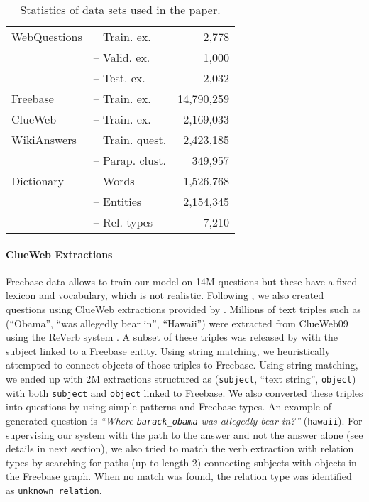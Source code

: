 \documentclass[runningheads,a4paper]{llncs}
\newcommand{\fb}{{\sc Freebase}\xspace}
\newcommand{\wk}{{\sc WikiAnswers}\xspace}
\newcommand{\wq}{{\sc WebQuestions}\xspace}
\newcommand{\cw}{{\sc ClueWeb}\xspace}
\newcommand{\ent}[1]{{\small {\tt #1}}}
\begin{document}
\begin{table}[t!]
\begin{center}
\begin{small}
\begin{tabular}{|ll|r|}
\hline 
\wq & -- Train. ex. & 2,778\\
& -- Valid. ex. & 1,000\\
& -- Test. ex. & 2,032\\
\fb & -- Train. ex. & 14,790,259 \\
\cw & -- Train. ex. & 2,169,033 \\
\wk & -- Train. quest. & 2,423,185 \\
 & -- Parap. clust. & 349,957 \\
\hline 
Dictionary & -- Words & 1,526,768\\
& -- Entities &  2,154,345 \\
& -- Rel. types & 7,210 \\ 
\hline 
\end{tabular}
\end{small}
\caption{\label{tab:stats} Statistics of data sets used in the paper.}
\end{center}
\end{table}



\paragraph{ClueWeb Extractions}

\fb data allows to train our model on 14M questions but these have a
fixed lexicon and vocabulary, which is not realistic.
Following  \cite{berant-EtAl:2013:EMNLP}, we also created questions
using \cw extractions provided by \cite{lin2012entity}.
Millions of text triples such as (``Obama'', ``was allegedly bear
in'', ``Hawaii'') were extracted from ClueWeb09 using the ReVerb
system \cite{ReVerb2011}. A subset of these triples was released
by \cite{lin2012entity} with the subject linked to a \fb entity.
Using string matching, we heuristically attempted to connect objects
of those triples to \fb. 
\fi
Using string matching, we ended up with 2M extractions structured as
(\ent{subject}, ``text string'', \ent{object}) with both \ent{subject} and
\ent{object} linked to \fb.
We also converted these triples into questions by using simple patterns and
\fb types. 
An example of generated question is {\em ``Where
\ent{barack\_obama} was allegedly bear in?''} (\ent{hawaii}).
For supervising our system with the path to the answer and not the
answer alone (see details in next section), we also tried to match the
verb extraction with relation types by searching for paths (up to
length 2) connecting subjects with objects in the \fb graph.
When no match was found, the relation type was identified as
\ent{unknown\_relation}.
\fi 
\end{document}
